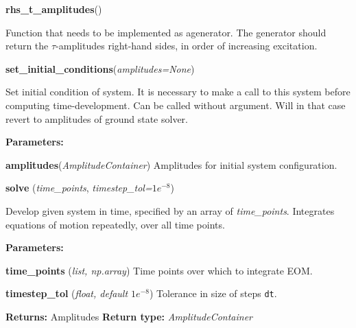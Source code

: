 \begin{tcolorbox}
{    \hspace{2em} \textbf{rhs\_t\_amplitudes}()
        \begin{adjustwidth}{4em}{}
        Function that needs to be implemented as agenerator. The generator 
        should return the $\tau$-amplitudes right-hand sides, in order of 
        increasing excitation.
        \end{adjustwidth}

    \hspace{2em} \textbf{set\_initial\_conditions}(\emph{amplitudes=None})
        \begin{adjustwidth}{4em}{}
        Set initial condition of system. It is necessary to make a call to 
        this system before computing time-development. Can be called without 
        argument. Will in that case revert to amplitudes of ground state solver.

        \textbf{Parameters: }

            \hspace{1.5em} \textbf{amplitudes}(\emph{AmplitudeContainer})
                Amplitudes for initial system configuration.
        \end{adjustwidth}

    \hspace{2em} \textbf{solve} (\emph{time\_points}, \emph{timestep\_tol=$1e^{-8}$})
        \begin{adjustwidth}{4em}{}
        Develop given system in time, specified by an array of \emph{time\_points}.
        Integrates equations of motion repeatedly, over all time points.
        
        \textbf{Parameters:}

            \hspace{1.5em} \textbf{time\_points} (\emph{list, np.array})
                Time points over which to integrate EOM.

            \hspace{1.5em} \textbf{timestep\_tol} (\emph{float, default $1e^{-8}$})
                Tolerance in size of steps \lstinline{dt}.

        \textbf{Returns:} Amplitudes
        \textbf{Return type:} \emph{AmplitudeContainer}
        \end{adjustwidth}
   
    } 
\end{tcolorbox}